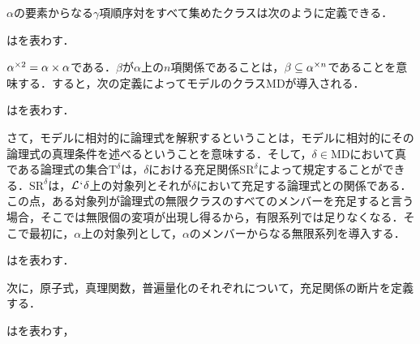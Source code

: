 $\alpha$の要素からなる$\gamma$項順序対をすべて集めたクラスは次のように定義できる．

\begin{df}
\label{df:直積の反復}
\kagi{$
    \timex{\alpha}{\gamma}
$}はを表わす．
\end{df}

\noindent $\alpha^{\times 2}=\alpha\times\alpha$である．$\beta$が$\alpha$上の$n$項関係であることは，$\beta\subseteq\alpha^{\times n}$であることを意味する．すると，次の定義によってモデルのクラス$ \mathrm{MD} $が導入される．

\begin{df}
\label{df:モデル}
はを表わす．
\end{df}

さて，モデルに相対的に論理式を解釈するということは，モデルに相対的にその論理式の真理条件を述べるということを意味する．そして，$\delta\in\mathrm{MD}$において真である論理式の集合$ \mathrm{T}^{\delta} $は，$\delta$における充足関係$\mathrm{SR}^{\delta}$によって規定することができる．$\mathrm{SR}^{\delta}$は，$\mathcal{L}{\mspace{1mu}{`}\mspace{1mu}}\delta$上の対象列とそれが$\delta$において充足する論理式との関係である．この点，ある対象列が論理式の無限クラスのすべてのメンバーを充足すると言う場合，そこでは無限個の変項が出現し得るから，有限系列では足りなくなる．そこで最初に，$\alpha$上の対象列として，$\alpha$のメンバーからなる無限系列を導入する．
\begin{df}
\label{df:対象列}
はを表わす．
\end{df}

\noindent 次に，原子式，真理関数，普遍量化のそれぞれについて，充足関係の断片を定義する．

\begin{df}
\label{df:原子式の充足関係}
はを表わす，
\end{df}

